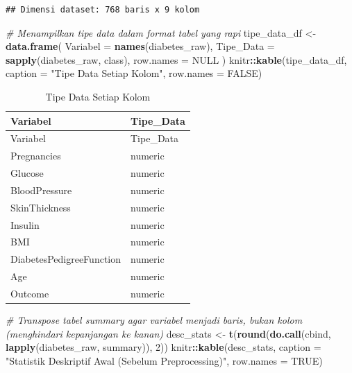 \documentclass[
  11pt,
]{article}
\newenvironment{Shaded}{\begin{snugshade}}{\end{snugshade}}
\newcommand{\AttributeTok}[1]{\textcolor[rgb]{0.13,0.29,0.53}{#1}}
\newcommand{\CommentTok}[1]{\textcolor[rgb]{0.56,0.35,0.01}{\textit{#1}}}
\newcommand{\ConstantTok}[1]{\textcolor[rgb]{0.56,0.35,0.01}{#1}}
\newcommand{\DecValTok}[1]{\textcolor[rgb]{0.00,0.00,0.81}{#1}}
\newcommand{\FunctionTok}[1]{\textcolor[rgb]{0.13,0.29,0.53}{\textbf{#1}}}
\newcommand{\NormalTok}[1]{#1}
\newcommand{\OtherTok}[1]{\textcolor[rgb]{0.56,0.35,0.01}{#1}}
\newcommand{\SpecialCharTok}[1]{\textcolor[rgb]{0.81,0.36,0.00}{\textbf{#1}}}
\newcommand{\StringTok}[1]{\textcolor[rgb]{0.31,0.60,0.02}{#1}}
\begin{document}
\begin{verbatim}
## Dimensi dataset: 768 baris x 9 kolom
\end{verbatim}

\begin{Shaded}
\begin{Highlighting}[]
\CommentTok{\# Menampilkan tipe data dalam format tabel yang rapi}
\NormalTok{tipe\_data\_df }\OtherTok{\textless{}{-}} \FunctionTok{data.frame}\NormalTok{(}
  \AttributeTok{Variabel =} \FunctionTok{names}\NormalTok{(diabetes\_raw),}
  \AttributeTok{Tipe\_Data =} \FunctionTok{sapply}\NormalTok{(diabetes\_raw, class),}
  \AttributeTok{row.names =} \ConstantTok{NULL}
\NormalTok{)}
\NormalTok{knitr}\SpecialCharTok{::}\FunctionTok{kable}\NormalTok{(tipe\_data\_df, }\AttributeTok{caption =} \StringTok{"Tipe Data Setiap Kolom"}\NormalTok{, }\AttributeTok{row.names =} \ConstantTok{FALSE}\NormalTok{)}
\end{Highlighting}
\end{Shaded}

\begin{longtable}[]{@{}ll@{}}
\caption{Tipe Data Setiap Kolom}\tabularnewline
\toprule\noalign{}
Variabel & Tipe\_Data \\
\midrule\noalign{}
\endfirsthead
\toprule\noalign{}
Variabel & Tipe\_Data \\
\midrule\noalign{}
\endhead
\bottomrule\noalign{}
\endlastfoot
Pregnancies & numeric \\
Glucose & numeric \\
BloodPressure & numeric \\
SkinThickness & numeric \\
Insulin & numeric \\
BMI & numeric \\
DiabetesPedigreeFunction & numeric \\
Age & numeric \\
Outcome & numeric \\
\end{longtable}

\begin{Shaded}
\begin{Highlighting}[]
\CommentTok{\# Transpose tabel summary agar variabel menjadi baris, bukan kolom (menghindari kepanjangan ke kanan)}
\NormalTok{desc\_stats }\OtherTok{\textless{}{-}} \FunctionTok{t}\NormalTok{(}\FunctionTok{round}\NormalTok{(}\FunctionTok{do.call}\NormalTok{(cbind, }\FunctionTok{lapply}\NormalTok{(diabetes\_raw, summary)), }\DecValTok{2}\NormalTok{))}
\NormalTok{knitr}\SpecialCharTok{::}\FunctionTok{kable}\NormalTok{(desc\_stats, }\AttributeTok{caption =} \StringTok{"Statistik Deskriptif Awal (Sebelum Preprocessing)"}\NormalTok{, }\AttributeTok{row.names =} \ConstantTok{TRUE}\NormalTok{)}
\end{Highlighting}
\end{Shaded}
\end{document}
